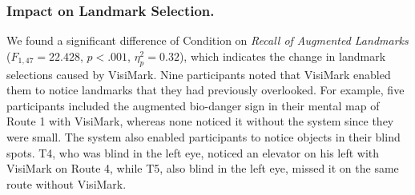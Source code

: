 \subsubsection{Impact on Landmark Selection.}
\label{Impact on Landmark Selection}
We found a significant difference of Condition on \textit{Recall of Augmented Landmarks} ($F_{1,47} = 22.428$, $p < .001$, $\eta _p^2 =0.32$), which indicates the change in landmark selections caused by VisiMark. Nine participants noted that VisiMark enabled them to notice landmarks that they had previously overlooked. %
For example, five participants included the augmented bio-danger sign in their mental map of Route 1 with VisiMark, whereas none noticed it without the system since they were small. %
The system also enabled participants to notice objects in their blind spots. T4, who was blind in the left eye, noticed an elevator on his left with VisiMark on Route 4, while T5, also blind in the left eye, missed it on the same route without VisiMark.%


